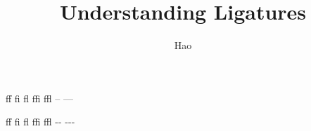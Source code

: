 \documentclass[a4paper,10pt]{article}
\title{Understanding Ligatures}
\author{Hao}
\begin{document}
\maketitle
ff fi fl ffi ffl -- ---

f\/f f\/i f\/l f\/f\/i f\/f\/l -\/- -\/-\/-
\end{document}
